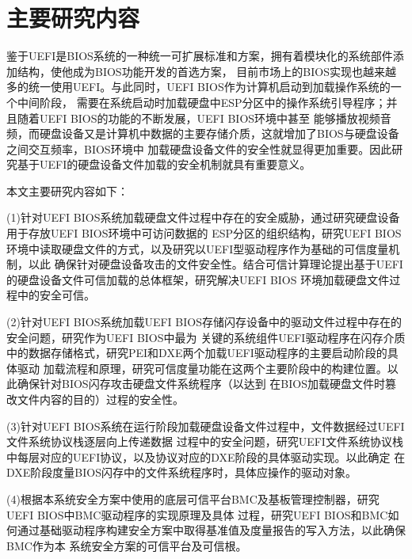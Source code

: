 \section{主要研究内容}
鉴于UEFI是BIOS系统的一种统一可扩展标准和方案，拥有着模块化的系统部件添加结构，使他成为BIOS功能开发的首选方案，
目前市场上的BIOS实现也越来越多的统一使用UEFI。与此同时，UEFI BIOS作为计算机启动到加载操作系统的一个中间阶段，
需要在系统启动时加载硬盘中ESP分区中的操作系统引导程序；并且随着UEFI BIOS的功能的不断发展，UEFI BIOS环境中甚至
能够播放视频音频，而硬盘设备又是计算机中数据的主要存储介质，这就增加了BIOS与硬盘设备之间交互频率，BIOS环境中
加载硬盘设备文件的安全性就显得更加重要。因此研究基于UEFI的硬盘设备文件加载的安全机制就具有重要意义。
\par 本文主要研究内容如下：
\par (1)针对UEFI BIOS系统加载硬盘文件过程中存在的安全威胁，通过研究硬盘设备用于存放UEFI BIOS环境中可访问数据的
ESP分区的组织结构，研究UEFI BIOS环境中读取硬盘文件的方式，以及研究以UEFI型驱动程序作为基础的可信度量机制，以此
确保针对硬盘设备攻击的文件安全性。结合可信计算理论提出基于UEFI的硬盘设备文件可信加载的总体框架，研究解决UEFI BIOS
环境加载硬盘文件过程中的安全可信。
\par (2)针对UEFI BIOS系统加载UEFI BIOS存储闪存设备中的驱动文件过程中存在的安全问题，研究作为UEFI BIOS中最为
关键的系统组件UEFI驱动程序在闪存介质中的数据存储格式，研究PEI和DXE两个加载UEFI驱动程序的主要启动阶段的具体驱动
加载流程和原理，研究可信度量功能在这两个主要阶段中的构建位置。以此确保针对BIOS闪存攻击硬盘文件系统程序（以达到
在BIOS加载硬盘文件时篡改文件内容的目的）过程的安全性。
\par (3)针对UEFI BIOS系统在运行阶段加载硬盘设备文件过程中，文件数据经过UEFI文件系统协议栈逐层向上传递数据
过程中的安全问题，研究UEFI文件系统协议栈中每层对应的UEFI协议，以及协议对应的DXE阶段的具体驱动实现。以此确定
在DXE阶段度量BIOS闪存中的文件系统程序时，具体应操作的驱动对象。
\par (4)根据本系统安全方案中使用的底层可信平台BMC及基板管理控制器，研究UEFI BIOS中BMC驱动程序的实现原理及具体
过程，研究UEFI BIOS和BMC如何通过基础驱动程序构建安全方案中取得基准值及度量报告的写入方法，以此确保BMC作为本
系统安全方案的可信平台及可信根。

%
%
